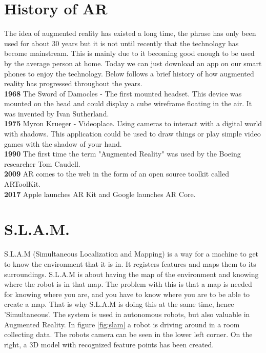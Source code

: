 \section{History of AR}
\label{sec:ARhistory}
The idea of augmented reality has existed a long time, the phrase has only been used for about 30 years but it is not until recently that the technology has become mainstream.
This is mainly due to it becoming good enough to be used by the average person at home. Today we can just download an app on our smart phones to enjoy the technology. Below follows a brief history of how augmented reality has progressed throughout the years.\\

\textbf{1968}
The Sword of Damocles - The first mounted headset.
This device was mounted on the head and could display a cube wireframe floating in the air. It was invented by Ivan Sutherland.\\

\textbf{1975}
Myron Krueger - Videoplace. Using cameras to interact with a digital world with shadows.
This application could be used to draw things or play simple video games with the shadow of your hand.
\cite{videoplace}\\

\textbf{1990}
The first time the term "Augmented Reality" was used by the Boeing researcher Tom Caudell.\\

\textbf{2009}
AR comes to the web in the form of an open source toolkit called ARToolKit.\\

\textbf{2017}
Apple launches AR Kit and Google launches AR Core.\\

\section{S.L.A.M.}
\label{sec:ARslam}
S.L.A.M (Simultaneous Localization and Mapping) is a way for a machine to get to know the environment that it is in. It registers features and maps them to its surroundings. S.L.A.M is about having the map of the environment and knowing where the robot is in that map.
The problem with this is that a map is needed for knowing where you are, and you have to know where you are to be able to create a map. That is why S.L.A.M is doing this at the same time, hence 'Simultaneous'. The system is used in autonomous robots, but also valuable in Augmented Reality. \cite{slam}
In figure \ref{fig:slam} a robot is driving around in a room collecting data. The robots 
camera can be seen in the lower left corner. On the right, a 3D model with 
recognized feature points has been created.

